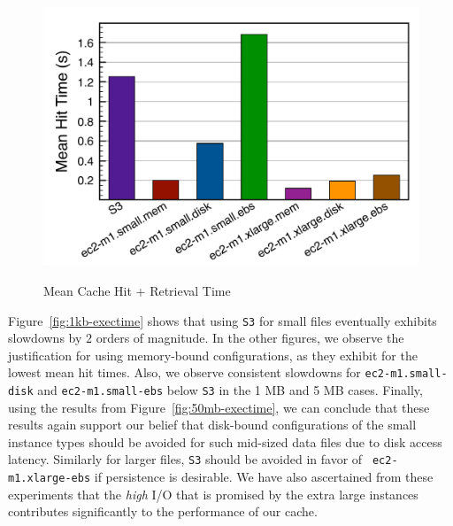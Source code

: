 \begin{figure}
\begin{center}
	{\label{fig:5mb-exectime}\includegraphics[scale=0.35]{figures/5mb-hitspeedup.pdf}}
	\caption{\label{fig:Speedup}Mean Cache Hit + Retrieval Time}
\end{center}
\end{figure}

Figure~\ref{fig:1kb-exectime} shows that using {\tt S3} for small files
eventually exhibits slowdowns by $2$ orders of magnitude. In the other figures,
we observe the justification for using memory-bound configurations, as they
exhibit for the lowest mean hit times. Also, we observe consistent slowdowns
for {\tt ec2-m1.small-disk} and {\tt ec2-m1.small-ebs} below {\tt S3} in the 1
MB and 5 MB cases.  Finally, using the results from
Figure~\ref{fig:50mb-exectime}, we can conclude that these results again
support our belief that disk-bound configurations of the small instance types
should be avoided for such mid-sized data files due to disk access latency.
Similarly for larger files, {\tt S3} should be avoided in favor of {\tt
ec2-m1.xlarge-ebs} if persistence is desirable. We have also ascertained from
these experiments that the \textit{high} I/O that is promised by the extra
large instances contributes significantly to the performance of our cache.

